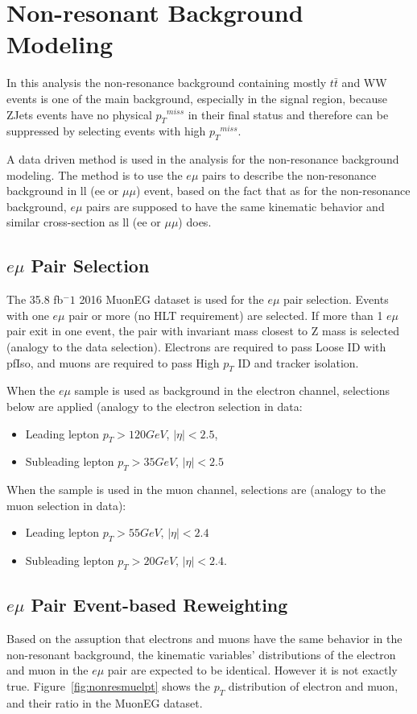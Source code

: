 \section{Non-resonant Background Modeling}
In this analysis the non-resonance background containing mostly $t\bar{t}$ and WW events is one of the main background, especially in the signal region, because ZJets events have no physical ${p_{T}}^{miss}$ in their final status and therefore can be suppressed by selecting events with high ${p_{T}}^{miss}$. 

\vspace{0.3cm}
A data driven method is used in the analysis for the non-resonance background modeling. The method is to use the $e\mu$ pairs to describe the non-resonance background in ll (ee or $\mu \mu$) event, based on the fact that as for the non-resonance background, $e\mu$ pairs are supposed to have the same kinematic behavior and similar cross-section as ll (ee or $\mu \mu$) does.

\subsection{$e\mu$ Pair Selection}
The 35.8 fb$^-1$ 2016 MuonEG dataset is used for the $e\mu$ pair selection.  Events with one $e\mu$ pair or more (no HLT requirement) are selected. If more than 1 $e\mu$ pair exit in one event, the pair with invariant mass closest to Z mass is selected (analogy to the data selection). Electrons are required to pass Loose ID with pfIso, and muons are required to pass High $p_T$ ID and tracker isolation. 

\vspace{0.3cm}
When the $e\mu$ sample is used as background in the electron channel, selections below are applied (analogy to the electron selection in data: 
\begin{itemize}
\item Leading lepton $p_{T}>120GeV$, $|\eta|<2.5$, 
\item Subleading lepton $p_{T}>35GeV$, $|\eta|<2.5$
\end{itemize}
When the sample is used in the muon channel, selections are (analogy to the muon selection in data): 
\begin{itemize}
\item Leading lepton $p_{T}>55GeV$, $|\eta|<2.4$
\item Subleading lepton $p_{T}>20GeV$, $|\eta|<2.4$. 
\end{itemize}

\subsection{$e\mu$ Pair Event-based Reweighting}
Based on the assuption that electrons and muons have the same behavior in the non-resonant background, the kinematic variables' distributions of the electron and muon in the $e\mu$ pair are expected to be identical. However it is not exactly true. Figure~\ref{fig:nonresmuelpt} shows the $p_T$ distribution of electron and muon, and their ratio in the MuonEG dataset.

